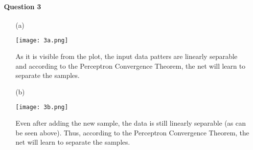 \documentclass[12pt]{article}
\begin{document}
\paragraph{Question 3}
\begin{itemize}
    \item[(a)] 
    \begin{center}
        \texttt{[image: 3a.png]}
    \end{center}
    As it is visible from the plot, the input data patters are linearly separable and according to the Perceptron Convergence Theorem, the net will learn to separate the samples.
    \item[(b)]
    \begin{center}
        \texttt{[image: 3b.png]}
    \end{center}
    Even after adding the new sample, the data is still linearly separable (as can be seen above). Thus, according to the Perceptron Convergence Theorem, the net will learn to separate the samples. 
\end{itemize}
\end{document}
